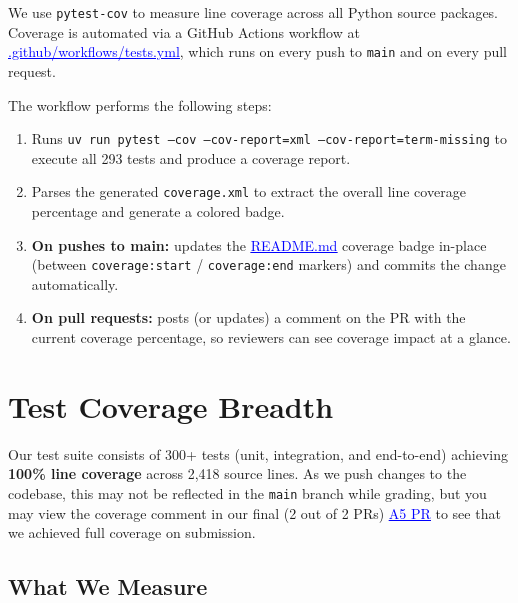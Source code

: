\documentclass[a4paper,12pt]{article}
\newcommand{\bluehref}[2]{\href{#1}{\textcolor{blue}{\uline{#2}}}}
\begin{document}
We use \texttt{pytest-cov} to measure line coverage across all Python source packages.
Coverage is automated via a GitHub Actions workflow at
\bluehref{https://github.com/UofT-CSC490-W2026/Lighthouse/blob/a5/.github/workflows/tests.yml}{.github/workflows/tests.yml},
which runs on every push to \texttt{main} and on every pull request.

The workflow performs the following steps:
\begin{enumerate}
  \item Runs \texttt{uv run pytest --cov --cov-report=xml --cov-report=term-missing} to
    execute all 293 tests and produce a coverage report.
  \item Parses the generated \texttt{coverage.xml} to extract the overall line coverage
    percentage and generate a colored badge.
  \item \textbf{On pushes to main:} updates the
    \bluehref{https://github.com/UofT-CSC490-W2026/Lighthouse/blob/main/README.md}{README.md}
    coverage badge in-place (between \texttt{coverage:start} / \texttt{coverage:end} markers)
    and commits the change automatically.
  \item \textbf{On pull requests:} posts (or updates) a comment on the PR with the current
    coverage percentage, so reviewers can see coverage impact at a glance.
\end{enumerate}

\newpage
\section{Test Coverage Breadth}

Our test suite consists of 300+ tests (unit, integration, and end-to-end) achieving
\textbf{100\% line coverage} across 2{,}418 source lines. As we push changes to the codebase, this may not be reflected in the \texttt{main} branch while grading, but you may view the coverage comment in our final (2 out of 2 PRs) \bluehref{https://github.com/UofT-CSC490-W2026/Lighthouse/pull/19}{A5 PR} to see that we achieved full coverage on submission.

\subsection{What We Measure}
\end{document}
